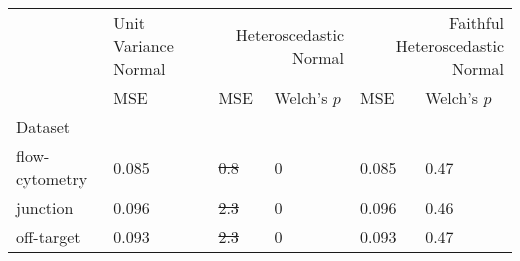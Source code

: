 \begin{tabular}{l|l|ll|ll}
\toprule
 & Unit Variance Normal & \multicolumn{2}{r}{Heteroscedastic Normal} & \multicolumn{2}{r}{Faithful Heteroscedastic Normal} \\
 & MSE & MSE & Welch's $p$ & MSE & Welch's $p$ \\
Dataset &  &  &  &  &  \\
\midrule
flow-cytometry & 0.085 & \sout{0.8} & 0 & 0.085 & 0.47 \\
junction & 0.096 & \sout{2.3} & 0 & 0.096 & 0.46 \\
off-target & 0.093 & \sout{2.3} & 0 & 0.093 & 0.47 \\
\bottomrule
\end{tabular}
